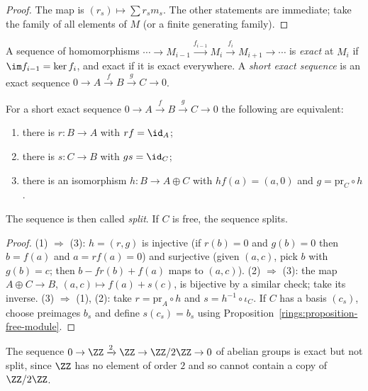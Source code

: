 \begin{proof}
The map is $(r_s) \mapsto \sum r_s m_s$. The other statements are immediate; take the family
of all elements of $M$ (or a finite generating family).
\end{proof}

\begin{definition}\label{rings:definition-exact}
A sequence of homomorphisms $\cdots \to M_{i-1} \xrightarrow{f_{i-1}} M_i \xrightarrow{f_i} M_{i+1} \to \cdots$ is
\emph{exact} at $M_i$ if $\im f_{i-1} = \ker f_i$, and exact if it is exact everywhere. A
\emph{short exact sequence} is an exact sequence $0 \to A \xrightarrow{f} B \xrightarrow{g} C \to 0$.
\end{definition}

\begin{proposition}\label{rings:proposition-splitting}
For a short exact sequence $0 \to A \xrightarrow{f} B \xrightarrow{g} C \to 0$ the following are
equivalent:
\begin{enumerate}
\item there is $r \colon B \to A$ with $rf = \id_A$;
\item there is $s \colon C \to B$ with $gs = \id_C$;
\item there is an isomorphism $h \colon B \to A \oplus C$ with $hf(a) = (a, 0)$ and
$g = \mathrm{pr}_C \circ h$.
\end{enumerate}
The sequence is then called \emph{split}. If $C$ is free, the sequence splits.
\end{proposition}

\begin{proof}
(1) $\Rightarrow$ (3): $h = (r, g)$ is injective (if $r(b) = 0$ and $g(b) = 0$ then
$b = f(a)$ and $a = rf(a) = 0$) and surjective (given $(a, c)$, pick $b$ with $g(b) = c$; then
$b - fr(b) + f(a)$ maps to $(a, c)$). (2) $\Rightarrow$ (3): the map
$A \oplus C \to B$, $(a, c) \mapsto f(a) + s(c)$, is bijective by a similar check; take its
inverse. (3) $\Rightarrow$ (1), (2): take $r = \mathrm{pr}_A \circ h$ and $s = h^{-1} \circ \iota_C$.
If $C$ has a basis $(c_s)$, choose preimages $b_s$ and define $s(c_s) = b_s$ using
Proposition~\ref{rings:proposition-free-module}.
\end{proof}

\begin{counterexample}\label{rings:counterexample-non-split}
The sequence $0 \to \ZZ \xrightarrow{2} \ZZ \to \ZZ/2\ZZ \to 0$ of abelian groups is exact but not split,
since $\ZZ$ has no element of order $2$ and so cannot contain a copy of $\ZZ/2\ZZ$.
\end{counterexample}

